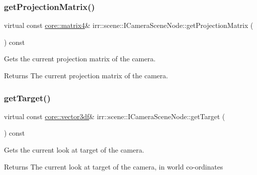 \subsubsection{\texorpdfstring{get\+Projection\+Matrix()}{getProjectionMatrix()}\hspace{0.1cm}{\footnotesize\ttfamily [2/2]}}
{\footnotesize\ttfamily virtual const \hyperlink{namespaceirr_1_1core_a4c9d4e29899535971052810954a14431}{core\+::matrix4}\& irr\+::scene\+::\+I\+Camera\+Scene\+Node\+::get\+Projection\+Matrix (\begin{DoxyParamCaption}{ }\end{DoxyParamCaption}) const\hspace{0.3cm}{\ttfamily [pure virtual]}}



Gets the current projection matrix of the camera. 

\begin{DoxyReturn}{Returns}
The current projection matrix of the camera. 
\end{DoxyReturn}
\mbox{\label{classirr_1_1scene_1_1ICameraSceneNode_a3ce50433986650eea15b20e4ed19c952}} 
\subsubsection{\texorpdfstring{get\+Target()}{getTarget()}\hspace{0.1cm}{\footnotesize\ttfamily [1/2]}}
{\footnotesize\ttfamily virtual const \hyperlink{namespaceirr_1_1core_ae6e2b2a6c552833ebbd5b7463d03586b}{core\+::vector3df}\& irr\+::scene\+::\+I\+Camera\+Scene\+Node\+::get\+Target (\begin{DoxyParamCaption}{ }\end{DoxyParamCaption}) const\hspace{0.3cm}{\ttfamily [pure virtual]}}



Gets the current look at target of the camera. 

\begin{DoxyReturn}{Returns}
The current look at target of the camera, in world co-\/ordinates 
\end{DoxyReturn}
\mbox{\label{classirr_1_1scene_1_1ICameraSceneNode_a3ce50433986650eea15b20e4ed19c952}} 
